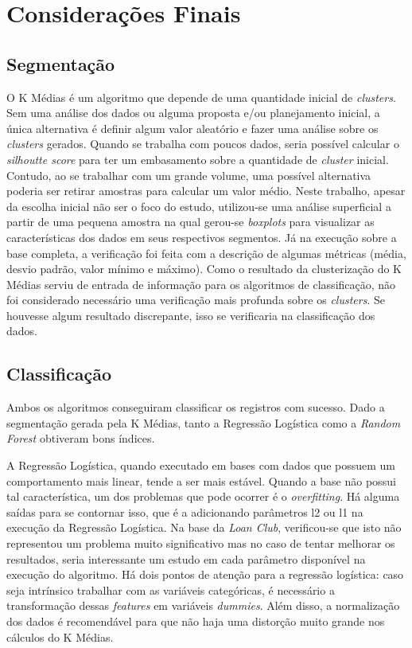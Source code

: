 \chapter{Considerações Finais}

\section{Segmentação}
O K Médias é um algoritmo que depende de uma quantidade inicial de \emph{clusters}. Sem uma análise dos dados ou alguma proposta e/ou planejamento inicial, a única alternativa é definir algum valor aleatório e fazer uma análise sobre os \emph{clusters} gerados. Quando se trabalha com poucos dados, seria possível calcular o \emph{silhoutte score} para ter um embasamento sobre a quantidade de \emph{cluster} inicial. Contudo, ao se trabalhar com um grande volume, uma possível alternativa poderia ser retirar amostras para calcular um valor médio. Neste trabalho, apesar da escolha inicial não ser o foco do estudo, utilizou-se uma análise superficial a partir de uma pequena amostra na qual gerou-se \emph{boxplots} para visualizar as características dos dados em seus respectivos segmentos. Já na execução sobre a base completa, a verificação foi feita com a descrição de algumas métricas (média, desvio padrão, valor mínimo e máximo). Como o resultado da clusterização do K Médias serviu de entrada de informação para os algoritmos de classificação, não foi considerado necessário uma verificação mais profunda sobre os \emph{clusters}. Se houvesse algum resultado discrepante, isso se verificaria na classificação dos dados.

\section{Classificação}

Ambos os algoritmos conseguiram classificar os registros com sucesso. Dado a segmentação gerada pela K Médias, tanto a Regressão Logística como a \emph{Random Forest} obtiveram bons índices.

A Regressão Logística, quando executado em bases com dados que possuem um comportamento mais linear, tende a ser mais estável. Quando a base não possui tal característica, um dos problemas que pode ocorrer é o \emph{overfitting}. Há alguma saídas para se contornar isso, que é a adicionando parâmetros l2 ou l1 na execução da Regressão Logística. Na base da \emph{Loan Club}, verificou-se que isto não representou um problema muito significativo mas no caso de tentar melhorar os resultados, seria interessante um estudo em cada parâmetro disponível na execução do algoritmo. Há dois pontos de atenção para a regressão logística: caso seja intrínsico trabalhar com as variáveis categóricas, é necessário a transformação dessas \emph{features} em variáveis \emph{dummies}. Além disso, a normalização dos dados é recomendável para que não haja uma distorção muito grande nos cálculos do K Médias.

